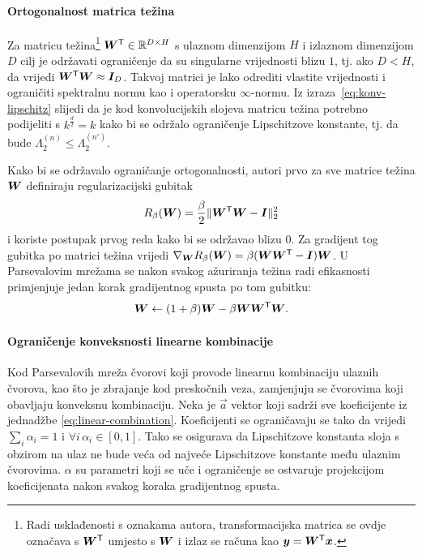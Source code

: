 \documentclass[utf8, seminar, numeric, lmodern]{feri}
\begin{document}
\paragraph{Ortogonalnost matrica težina} Za matricu težina\footnote{Radi usklađenosti s oznakama autora, transformacijska matrica se ovdje označava s $\bm{W}^\mathsf T$ umjesto s $\bm{W}$ i izlaz se računa kao $\bm{y}=\bm{W}^\mathsf T \bm{x}$.} $\bm{W}^\mathsf T \in\mathbb{R}^{D\times H}$ s ulaznom dimenzijom $H$ i izlaznom dimenzijom $D$ cilj je održavati ograničenje da su singularne vrijednosti blizu $1$, tj. ako $D<H$, da vrijedi $\bm{W}^\mathsf T \bm{W} \approx \bm{I}_D$. Takvoj matrici je lako odrediti vlastite vrijednosti i ograničiti spektralnu normu kao i operatorsku $\infty$-normu. Iz izraza~\ref{eq:konv-lipschitz} slijedi da je kod konvolucijskih slojeva matricu težina potrebno podijeliti s $k^\frac{d}{2}=k$ kako bi se održalo ograničenje Lipschitzove konstante, tj. da bude $\Lambda_2^{(n)}\leq\Lambda_2^{(n')}$. 

Kako bi se održavalo ograničanje ortogonalnosti, autori prvo za sve matrice težina $\bm{W}$ definiraju regularizacijski gubitak
\begin{equation}
R_\beta(\bm{W}) = \frac{\beta}{2}\lVert \bm{W}^\mathsf T \bm{W}-\bm{I}\rVert_2^2
\end{equation}
i koriste postupak prvog reda kako bi se održavao blizu 0. Za gradijent tog gubitka po matrici težina vrijedi $\nabla_{\bm{W}} R_\beta(\bm{W})=\beta(\bm{W}\bm{W}^\mathsf T-\bm{I})\bm{W}$. U Parsevalovim mrežama se nakon svakog ažuriranja težina radi efikasnosti primjenjuje jedan korak gradijentnog spusta po tom gubitku:
\begin{equation}
\bm{W} \gets (1+\beta)\bm{W}-\beta \bm{W}\bm{W}^\mathsf T \bm{W}. 
\end{equation}

\paragraph{Ograničenje konveksnosti linearne kombinacije} Kod Parsevalovih mreža čvorovi koji provode linearnu kombinaciju ulaznih čvorova, kao što je zbrajanje kod preskočnih veza, zamjenjuju se čvorovima koji obavljaju konveksnu kombinaciju. Neka je $\vec a$ vektor koji sadrži sve koeficijente iz jednadžbe \eqref{eq:linear-combination}. Koeficijenti se ograničavaju se tako da vrijedi $\sum_i \alpha_i=1$ i $\forall i\, \alpha_i \in \left[0,1\right]$. Tako se osigurava da Lipschitzove konstanta sloja s obzirom na ulaz ne bude veća od najveće Lipschitzove konstante među ulaznim čvorovima. $\alpha$ su parametri koji se uče i ograničenje se ostvaruje projekcijom koeficijenata nakon svakog koraka gradijentnog spusta. 
\end{document}
